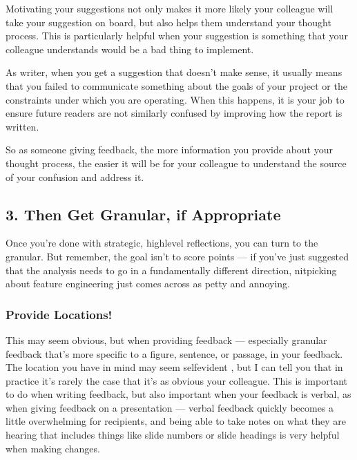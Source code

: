 \documentclass[letterpaper,10pt,english]{jupyterBook}
\begin{document}
\sphinxAtStartPar
Motivating your suggestions not only makes it more likely your colleague will take your suggestion on board, but also helps them understand your thought process. This is particularly helpful when your suggestion is something that your colleague understands would be a bad thing to implement.

\sphinxAtStartPar
As writer, when you get a suggestion that doesn’t make sense, it usually means that you failed to communicate something about the goals of your project or the constraints under which you are operating. When this happens, it is your job to ensure future readers are not similarly confused by improving how the report is written.

\sphinxAtStartPar
So as someone giving feedback, the more information you provide about your thought process, the easier it will be for your colleague to understand the source of your confusion and address it.


\subsection{3. Then Get Granular, if Appropriate}
\label{\detokenize{40_in_practice/30_giving_feedback:then-get-granular-if-appropriate}}
\sphinxAtStartPar
Once you’re done with strategic, high\sphinxhyphen{}level reflections,  you can turn to the granular. But remember, the goal isn’t to score points — if you’ve just suggested that the analysis needs to go in a fundamentally different direction, nitpicking about feature engineering just comes across as petty and annoying.


\subsubsection{Provide Locations!}
\label{\detokenize{40_in_practice/30_giving_feedback:provide-locations}}
\sphinxAtStartPar
This may seem obvious, but when providing feedback — especially granular feedback that’s more specific to a figure, sentence, or passage,  in your feedback. The location you have in mind may seem self\sphinxhyphen{}evident , but I can tell you that in practice it’s rarely the case that it’s as obvious your colleague. This is important to do when writing feedback, but also important when your feedback is verbal, as when giving feedback on a presentation — verbal feedback quickly becomes a little overwhelming for recipients, and being able to take notes on what they are hearing that includes things like slide numbers or slide headings is very helpful when making changes.
\end{document}
